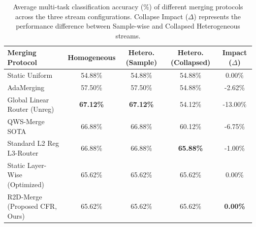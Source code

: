 \begin{table}[t]
\caption{Average multi-task classification accuracy (\%) of different merging protocols across the three stream configurations. Collapse Impact ($\Delta$) represents the performance difference between Sample-wise and Collapsed Heterogeneous streams.}
\label{tab:main_results}
\vskip 0.15in
\begin{center}
\begin{small}
\begin{sc}
\begin{tabular}{lcccc}
\toprule
Merging Protocol & Homogeneous & Hetero. (Sample) & Hetero. (Collapsed) & Impact ($\Delta$) \\
\midrule
Static Uniform & 54.88\% & 54.88\% & 54.88\% & 0.00\% \\
AdaMerging & 57.50\% & 57.50\% & 54.88\% & -2.62\% \\
Global Linear Router (Unreg) & \textbf{67.12\%} & \textbf{67.12\%} & 54.12\% & -13.00\% \\
QWS-Merge SOTA & 66.88\% & 66.88\% & 60.12\% & -6.75\% \\
Standard L2 Reg L3-Router & 66.88\% & 66.88\% & \textbf{65.88\%} & -1.00\% \\
Static Layer-Wise (Optimized) & 65.62\% & 65.62\% & 65.62\% & 0.00\% \\
R2D-Merge (Proposed CFR, Ours) & 65.62\% & 65.62\% & 65.62\% & \textbf{0.00\%} \\
\bottomrule
\end{tabular}
\end{sc}
\end{small}
\end{center}
\vskip -0.1in
\end{table}

